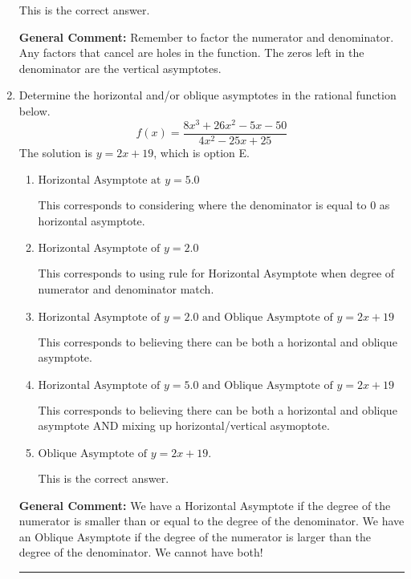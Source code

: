 \documentclass{extbook}[14pt]
\newcommand{\litem}[1]{\item #1

\rule{\textwidth}{0.4pt}}
\begin{document}
\begin{enumerate}
{\begin{enumerate}[label=\Alph*.]
This is the correct answer.
\end{enumerate}

\textbf{General Comment:} Remember to factor the numerator and denominator. Any factors that cancel are holes in the function. The zeros left in the denominator are the vertical asymptotes.
}
\litem{
Determine the horizontal and/or oblique asymptotes in the rational function below.
\[ f(x) = \frac{8x^{3} +26 x^{2} -5 x -50}{4x^{2} -25 x + 25} \]The solution is \( y = 2x + 19 \), which is option E.\begin{enumerate}[label=\Alph*.]
\item \( \text{Horizontal Asymptote at } y = 5.0 \)

This corresponds to considering where the denominator is equal to 0 as horizontal asymptote.
\item \( \text{Horizontal Asymptote of } y = 2.0  \)

This corresponds to using rule for Horizontal Asymptote when degree of numerator and denominator match.
\item \( \text{Horizontal Asymptote of } y = 2.0 \text{ and Oblique Asymptote of } y = 2x + 19 \)

This corresponds to believing there can be both a horizontal and oblique asymptote.
\item \( \text{Horizontal Asymptote of } y = 5.0 \text{ and Oblique Asymptote of } y = 2x + 19 \)

This corresponds to believing there can be both a horizontal and oblique asymptote AND mixing up horizontal/vertical asymoptote.
\item \( \text{Oblique Asymptote of } y = 2x + 19. \)

This is the correct answer.
\end{enumerate}

\textbf{General Comment:} We have a Horizontal Asymptote if the degree of the numerator is smaller than or equal to the degree of the denominator. We have an Oblique Asymptote if the degree of the numerator is larger than the degree of the denominator. We cannot have both!
}
\end{enumerate}
\end{document}
